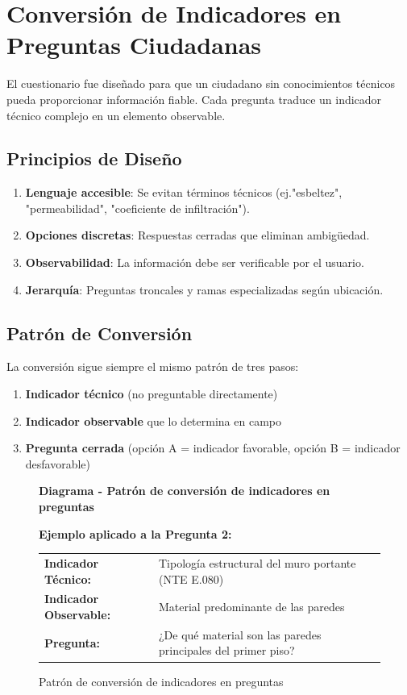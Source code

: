 \documentclass[12pt, letterpaper]{article}
\newcommand{\diagrambox}[3]{%
  \begin{figure}[H]
    \centering
    \begin{tcolorbox}[colback=white!90!blue, colframe=blue!60!black, width=\linewidth, arc=3mm, auto outer arc]
      \centering
      \textbf{Diagrama - #2} %
      \vspace{0.5cm}
      \parbox{0.95\linewidth}{\centering #3}
    \end{tcolorbox}
    \caption{#2}
    \label{fig:#1}
  \end{figure}
}
\begin{document}
\section{Conversión de Indicadores en Preguntas Ciudadanas}

El cuestionario fue diseñado para que un ciudadano sin conocimientos técnicos pueda proporcionar información fiable. Cada pregunta traduce un indicador técnico complejo en un elemento observable.

\subsection{Principios de Diseño}

\begin{enumerate}
  \item \textbf{Lenguaje accesible}: Se evitan términos técnicos (ej."esbeltez", "permeabilidad", "coeficiente de infiltración").
  \item \textbf{Opciones discretas}: Respuestas cerradas que eliminan ambigüedad.
  \item \textbf{Observabilidad}: La información debe ser verificable por el usuario.
  \item \textbf{Jerarquía}: Preguntas troncales y ramas especializadas según ubicación.
\end{enumerate}

\subsection{Patrón de Conversión}

La conversión sigue siempre el mismo patrón de tres pasos:

\begin{enumerate}
  \item \textbf{Indicador técnico} (no preguntable directamente)
  \item \textbf{Indicador observable} que lo determina en campo
  \item \textbf{Pregunta cerrada} (opción A = indicador favorable, opción B = indicador desfavorable)
\end{enumerate}

\diagrambox{conversion_patron}{Patrón de conversión de indicadores en preguntas}{
  \textbf{Ejemplo aplicado a la Pregunta 2:}
  
  \vspace{0.3cm}
  \begin{tabular}{p{3cm} p{10cm}}
    \textbf{Indicador Técnico:} & Tipología estructural del muro portante (NTE E.080) \\
    \textbf{Indicador Observable:} & Material predominante de las paredes \\
    \textbf{Pregunta:} & ¿De qué material son las paredes principales del primer piso?
  \end{tabular}
}
\end{document}
